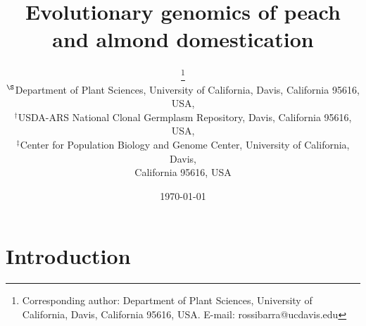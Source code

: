 \documentclass[12pt]{article}
\begin{document}
\title{Evolutionary genomics of peach \\and almond domestication}

\author{\small{}\thanks{Corresponding author: Department of Plant Sciences, University of California, Davis, California 95616, USA. E-mail: \mbox{rossibarra@ucdavis.edu}} \\[0.3cm]
     \small\sf $^{\S}$Department of Plant Sciences, University of California, Davis, California 95616, USA,\\
     \small\sf $^{\dag}$USDA-ARS National Clonal Germplasm Repository, Davis, California 95616, USA,\\
     \small\sf $^{\ddag}$Center for Population Biology and Genome Center, University of California, Davis, \\ \small\sf California 95616, USA}

\date{\today}
\maketitle

\section*{Introduction}
\end{document}
